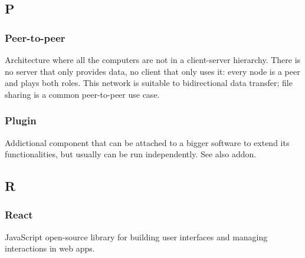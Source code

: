 \subsection*{P}

\subsubsection*{Peer-to-peer}
Architecture where all the computers are not in a client-server hierarchy. There is no server that only provides data, no client that only uses it: every node is a peer and plays both roles. This network is suitable to bidirectional data transfer; file sharing is a common peer-to-peer use case.

\subsubsection*{Plugin}
Addictional component that can be attached to a bigger software to extend its functionalities, but usually can be run independently. See also addon\glo.





\subsection*{R}

\subsubsection*{React}
JavaScript open-source library for building user interfaces and managing interactions in web apps.

